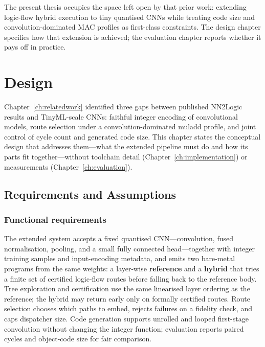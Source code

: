 The present thesis occupies the space left open by that prior work: extending logic-flow hybrid execution to tiny quantised \acp{CNN} while treating code size and convolution-dominated \ac{MAC} profiles as first-class constraints.
The design chapter specifies how that extension is achieved; the evaluation chapter reports whether it pays off in practice.

\chapter{Design}
\label{ch:design}

Chapter~\ref{ch:relatedwork} identified three gaps between published NN2Logic results and TinyML-scale \acp{CNN}: faithful integer encoding of convolutional models, route selection under a convolution-dominated muladd profile, and joint control of cycle count and generated code size.
This chapter states the conceptual design that addresses them---what the extended pipeline must do and how its parts fit together---without toolchain detail (Chapter~\ref{ch:implementation}) or measurements (Chapter~\ref{ch:evaluation}).


\section{Requirements and Assumptions}
\label{sec:design-requirements}

\subsection{Functional requirements}

The extended system accepts a fixed quantised \ac{CNN}---convolution, fused normalisation, pooling, and a small fully connected head---together with integer training samples and input-encoding metadata, and emits two bare-metal programs from the same weights: a layer-wise \textbf{reference} and a \textbf{hybrid} that tries a finite set of certified logic-flow routes before falling back to the reference body.
Tree exploration and certification use the same linearised layer ordering as the reference; the hybrid may return early only on formally certified routes.
Route selection chooses which paths to embed, rejects failures on a fidelity check, and caps dispatcher size.
Code generation supports unrolled and looped first-stage convolution without changing the integer function; evaluation reports paired cycles and object-code size for fair comparison.

